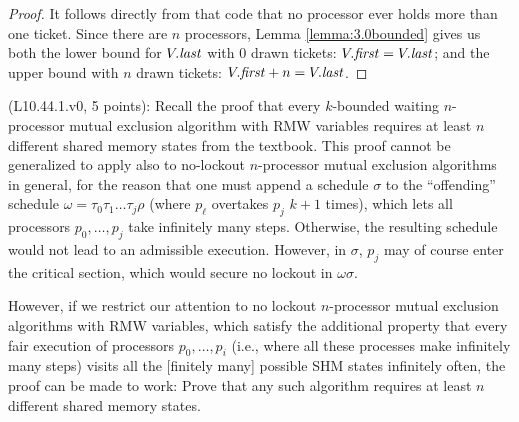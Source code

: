 \begin{proof}
It follows directly from that code that no processor ever holds more than one
ticket. Since there are $n$ processors, Lemma \ref{lemma:3.0bounded} gives us
both the lower bound for $V.\mathit{last}$ with $0$ drawn tickets: $V.\mathit{first} = V.\mathit{last}$;
and the upper bound with $n$ drawn tickets: $V.\mathit{first} + n = V.\mathit{last}$.
\end{proof}



\begin{Exc}{(L10.44.1.v0, 5 points):}
Recall the proof that every $k$-bounded waiting $n$-processor mutual exclusion
algorithm with RMW variables requires at least $n$ different shared
memory states from the textbook. This proof cannot be generalized to apply also to no-lockout
$n$-processor mutual exclusion algorithms in general, for the reason that one must
append a schedule $\sigma$ to the ``offending'' schedule $\omega=\tau_0\tau_1\dots\tau_j\rho$
(where $p_{\ell}$ overtakes $p_j$ $k+1$ times), which lets all processors
$p_0,\dots,p_j$ take infinitely many steps. Otherwise, the resulting schedule
would not lead to an admissible execution. However, in $\sigma$, $p_j$ may of course enter the
critical section, which would secure no lockout in $\omega\sigma$.

However, if we restrict our attention to no lockout $n$-processor
mutual exclusion algorithms with RMW variables, which satisfy the additional
property that every fair execution of processors $p_0,\dots,p_i$
(i.e., where all these processes make infinitely many steps)
visits all the [finitely many] possible SHM states infinitely often,
the proof can be
made to work: Prove that any such algorithm requires at least $n$
different shared memory states.
\end{Exc}
